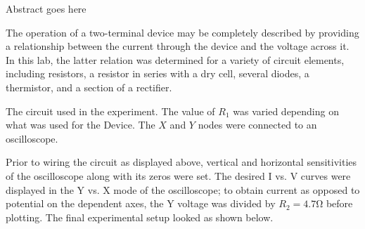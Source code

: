 
\physics

\begin{paperabs}

	Abstract goes here
	
\end{paperabs}

\begin{paper}
	
	
	The operation of a two-terminal device may be completely described by providing a relationship between the current through the device and the voltage across it. In this lab, the latter relation was determined for a variety of circuit elements, including resistors, a resistor in series with a dry cell, several diodes, a thermistor, and a section of a rectifier. 

	{The circuit used in the experiment.
		The value of $R_1$ was varied depending on what was used for the Device.
		The $X$ and $Y$ nodes were connected to an oscilloscope.}

	Prior to wiring the circuit as displayed above, vertical and horizontal sensitivities of the oscilloscope along with its zeros were set. The desired I vs. V curves were displayed in the Y vs. X mode of the oscilloscope; to obtain current as opposed to potential on the dependent axes, the Y voltage was divided by \( R_2 = 4.7 \si{\ohm} \) before plotting. The final experimental setup looked as shown below.
	

\end{paper}
